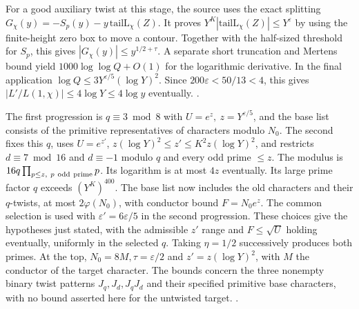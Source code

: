 For a good auxiliary twist at this stage, the source uses the exact splitting \(G_\chi(y)=-S_p(y)-y\,\mathrm{tailL}_\chi(Z)\). It proves \(Y^K|\mathrm{tailL}_\chi(Z)|\le Y^\varepsilon\) by using the finite-height zero box to move a contour. Together with the half-sized threshold for \(S_p\), this gives \(|G_\chi(y)|\le y^{1/2+\tau}\). A separate short truncation and Mertens bound yield \(1000\log\log Q+O(1)\) for the logarithmic derivative. In the final application \(\log Q\le3Y^{\varepsilon/5}(\log Y)^2\). Since \(200\varepsilon<50/13<4\), this gives \(\left|L'/L(1,\chi)\right|\le4\log Y\le4\log y\) eventually. \quad
{}\quad
{}.

The first progression is \(q\equiv3\bmod8\) with \(U=e^z,\ z=Y^{\varepsilon/5}\), and the base list consists of the primitive representatives of characters modulo \(N_0\). The second fixes this \(q\), uses \(U=e^{z'}\), \(z(\log Y)^2\le z'\le K^2z(\log Y)^2\), and restricts \(d\equiv7\bmod16\) and \(d\equiv-1\) modulo \(q\) and every odd prime \(\le z\). The modulus is \(16q\prod_{p\le z,\ p\ {\rm odd\ prime}}p\). Its logarithm is at most \(4z\) eventually. Its large prime factor \(q\) exceeds \((Y^K)^{400}\). The base list now includes the old characters and their \(q\)-twists, at most \(2\varphi(N_0)\), with conductor bound \(F=N_0e^z\). The common selection is used with \(\varepsilon'=6\varepsilon/5\) in the second progression. These choices give the hypotheses just stated, with the admissible \(z'\) range and \(F\le\sqrt U\) holding eventually, uniformly in the selected \(q\). Taking \(\eta=1/2\) successively produces both primes. At the top, \(N_0=8M,\tau=\varepsilon/2\) and \(z'=z(\log Y)^2\), with \(M\) the conductor of the target character. The bounds concern the three nonempty binary twist patterns \(J_q,J_d,J_qJ_d\) and their specified primitive base characters, with no bound asserted here for the untwisted target. \quad
{}\quad
{}\quad
{}.

